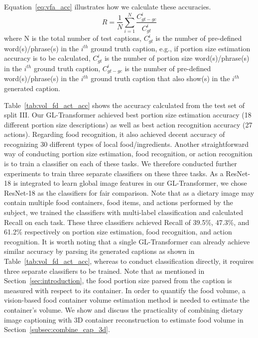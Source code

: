 \documentclass[journal]{IEEEtran}
\begin{document}
Equation~\ref{eq:vfa_acc} illustrates how we calculate these accuracies.
\begin{equation}\label{eq:vfa_acc}
    R = \frac{1}{N}\sum_{i=1}^{N}\frac{{C_{gt-gc}^{i}}}{C_{gt}^{i}}
\end{equation}
where N is the total number of test captions, $C_{gt}^{i}$ is the number of pre-defined word(s)/phrase(s) in the $i^{th}$ ground truth caption, e.g., if portion size estimation accuracy is to be calculated, $C_{gt}^{i}$ is the number of portion size word(s)/phrase(s) in the $i^{th}$ ground truth caption, $C_{gt-gc}^{i}$ is the number of pre-defined word(s)/phrase(s) in the $i^{th}$ ground truth caption that also show(s) in the $i^{th}$ generated caption.

Table~\ref{tab:vol_fd_act_acc} shows the accuracy calculated from the test set of split III. Our GL-Transformer achieved best portion size estimation accuracy (18 different portion size descriptions) as well as best action recognition accuracy (27 actions). Regarding food recognition, it also achieved decent accuracy of recognizing 30 different types of local food/ingredients. Another straightforward way of conducting portion size estimation, food recognition, or action recognition is to train a classifier on each of these tasks. We therefore conducted further experiments to train three separate classifiers on these three tasks. As a ResNet-18 is integrated to learn global image features in our GL-Transformer, we chose ResNet-18 as the classifiers for fair comparison. Note that as a dietary image may contain multiple food containers, food items, and actions performed by the subject, we trained the classifiers with multi-label classification and calculated Recall on each task. These three classifiers achieved Recall of 39.5\%, 47.3\%, and 61.2\% respectively on portion size estimation, food recognition, and action recognition. It is worth noting that a single GL-Transformer can already achieve similar accuracy by parsing its generated captions as shown in Table~\ref{tab:vol_fd_act_acc}, whereas to conduct classification directly, it requires three separate classifiers to be trained. Note that as mentioned in Section~\ref{sec:introduction}, the food portion size parsed from the caption is measured with respect to its container. In order to quantify the food volume, a vision-based food container volume estimation method is needed to estimate the container's volume. We show and discuss the practicality of combining dietary image captioning with 3D container reconstruction to estimate food volume in Section~\ref{subsec:combine_cap_3d}.
\end{document}
